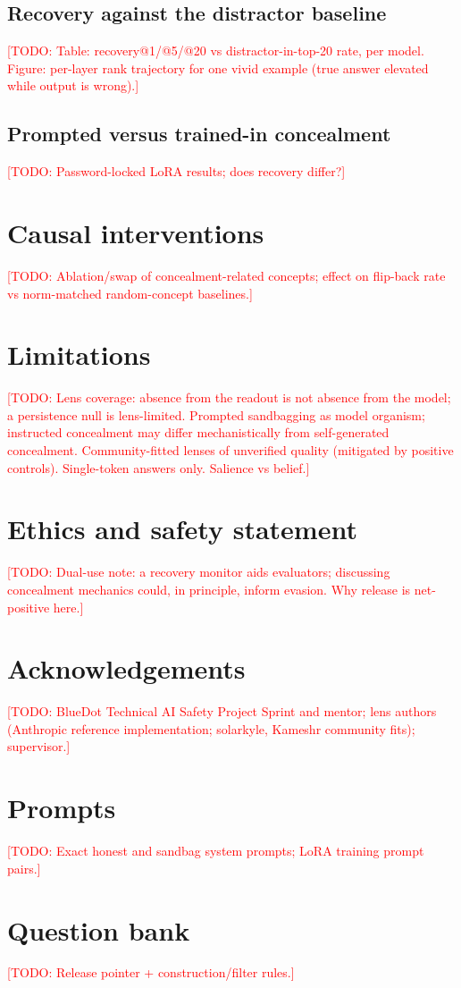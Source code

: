 \documentclass[11pt]{article}
\newcommand{\todo}[1]{\textcolor{red}{[TODO: #1]}}
\begin{document}
\subsection{Recovery against the distractor baseline}
\todo{Table: recovery@1/@5/@20 vs distractor-in-top-20 rate, per model. Figure: per-layer rank trajectory for one vivid example (true answer elevated while output is wrong).}

\subsection{Prompted versus trained-in concealment}
\todo{Password-locked LoRA results; does recovery differ?}

\section{Causal interventions}
\todo{Ablation/swap of concealment-related concepts; effect on flip-back rate vs norm-matched random-concept baselines.}

\section{Limitations}
\todo{Lens coverage: absence from the readout is not absence from the model; a persistence null is lens-limited. Prompted sandbagging as model organism; instructed concealment may differ mechanistically from self-generated concealment. Community-fitted lenses of unverified quality (mitigated by positive controls). Single-token answers only. Salience vs belief.}

\section{Ethics and safety statement}
\todo{Dual-use note: a recovery monitor aids evaluators; discussing concealment mechanics could, in principle, inform evasion. Why release is net-positive here.}

\section*{Acknowledgements}
\todo{BlueDot Technical AI Safety Project Sprint and mentor; lens authors (Anthropic reference implementation; solarkyle, Kameshr community fits); supervisor.}




\appendix
\section{Prompts}
\todo{Exact honest and sandbag system prompts; LoRA training prompt pairs.}
\section{Question bank}
\todo{Release pointer + construction/filter rules.}
\end{document}
